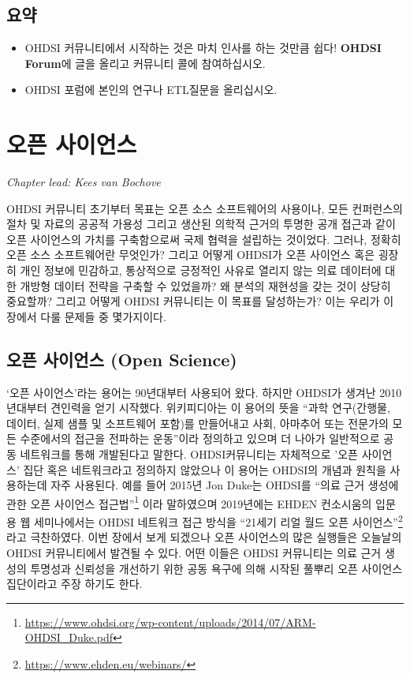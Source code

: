 \documentclass[11pt]{book}
\let\rmarkdownfootnote\footnote%
\def\footnote{\protect\rmarkdownfootnote}
\theoremstyle{definition}
\theoremstyle{definition}
\theoremstyle{definition}
\theoremstyle{remark}
\let\BeginKnitrBlock\begin \let\EndKnitrBlock\end
\begin{document}
\section{요약}\label{-1}

\BeginKnitrBlock{rmdsummary}
\begin{itemize}
\item
  OHDSI 커뮤니티에서 시작하는 것은 마치 인사를 하는 것만큼 쉽다!
  \textbf{OHDSI Forum}에 글을 올리고 커뮤니티 콜에 참여하십시오.
\item
  OHDSI 포럼에 본인의 연구나 ETL질문을 올리십시오.
\end{itemize}
\EndKnitrBlock{rmdsummary}

\chapter{오픈 사이언스}\label{OpenScience}


\emph{Chapter lead: Kees van Bochove}

OHDSI 커뮤니티 초기부터 목표는 오픈 소스 소프트웨어의 사용이나, 모든
컨퍼런스의 절차 및 자료의 공공적 가용성 그리고 생산된 의학적 근거의
투명한 공개 접근과 같이 오픈 사이언스의 가치를 구축함으로써 국제 협력을
설립하는 것이었다. 그러나, 정확히 오픈 소스 소프트웨어란 무엇인가?
그리고 어떻게 OHDSI가 오픈 사이언스 혹은 굉장히 개인 정보에 민감하고,
통상적으로 긍정적인 사유로 열리지 않는 의료 데이터에 대한 개방형 데이터
전략을 구축할 수 있었을까? 왜 분석의 재현성을 갖는 것이 상당히 중요할까?
그리고 어떻게 OHDSI 커뮤니티는 이 목표를 달성하는가? 이는 우리가 이
장에서 다룰 문제들 중 몇가지이다.

\section{오픈 사이언스 (Open Science)}\label{--open-science}

`오픈 사이언스'라는 용어는 90년대부터 사용되어 왔다. 하지만 OHDSI가
생겨난 2010년대부터 견인력을 얻기 시작했다.
위키피디아\citep{wiki:Open_science}는 이 용어의 뜻을 ``과학 연구(간행물,
데이터, 실제 샘플 및 소프트웨어 포함)를 만들어내고 사회, 아마추어 또는
전문가의 모든 수준에서의 접근을 전파하는 운동''이라 정의하고 있으며 더
나아가 일반적으로 공동 네트워크를 통해 개발된다고 말한다.
OHDSI커뮤니티는 자체적으로 '오픈 사이언스' 집단 혹은 네트워크라고
정의하지 않았으나 이 용어는 OHDSI의 개념과 원칙을 사용하는데 자주
사용된다. 예를 들어 2015년 Jon Duke는 OHDSI를 ``의료 근거 생성에 관한
오픈 사이언스 접근법''\footnote{\url{https://www.ohdsi.org/wp-content/uploads/2014/07/ARM-OHDSI_Duke.pdf}}
이라 말하였으며 2019년에는 EHDEN 컨소시움의 입문용 웹 세미나에서는 OHDSI
네트워크 접근 방식을 ``21세기 리얼 월드 오픈 사이언스''\footnote{\url{https://www.ehden.eu/webinars/}}
라고 극찬하였다. 이번 장에서 보게 되겠으나 오픈 사이언스의 많은 실행들은
오늘날의 OHDSI 커뮤니티에서 발견될 수 있다. 어떤 이들은 OHDSI 커뮤니티는
의료 근거 생성의 투명성과 신뢰성을 개선하기 위한 공동 욕구에 의해 시작된
풀뿌리 오픈 사이언스 집단이라고 주장 하기도 한다.
\end{document}
